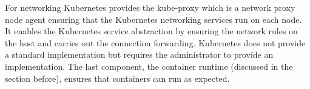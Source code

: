 For networking Kubernetes provides the kube-proxy which is a network proxy node agent ensuring that the Kubernetes networking services run on each node. It enables the Kubernetes service abstraction by ensuring the network rules on the host and carries out the connection forwarding. Kubernetes does not provide a standard implementation but requires the administrator to provide an implementation. The last component, the container runtime (discussed in the section before), ensures that containers can run as expected.



